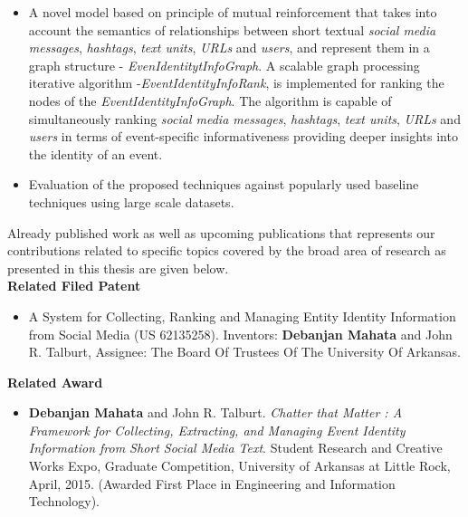 \begin{itemize}
\item A novel model based on principle of mutual reinforcement that takes into account the semantics of relationships between short textual \textit{social media messages}, \textit{hashtags}, \textit{text units}, \textit{URLs} and \textit{users}, and represent them in a graph structure - \textit{EvenIdentitytInfoGraph}. A scalable graph processing iterative algorithm -\textit{EventIdentityInfoRank}, is implemented for ranking the nodes of the \textit{EventIdentityInfoGraph}. The algorithm is capable of simultaneously ranking \textit{social media messages}, \textit{hashtags}, \textit{text units}, \textit{URLs} and \textit{users} in terms of event-specific informativeness providing deeper insights into the identity of an event.

\item Evaluation of the proposed techniques against popularly used baseline techniques using large scale datasets.

\end{itemize}

Already published work as well as upcoming publications that represents our contributions related to specific topics covered by the broad area of research as presented in this thesis are given below. \\ 

\textbf{\LARGE Related Filed Patent}
\begin{itemize}
\item A System for Collecting, Ranking and Managing Entity Identity Information from Social Media (US 62135258). Inventors: \textbf{Debanjan Mahata} and John R. Talburt, Assignee: The Board Of Trustees Of The University Of Arkansas.
\end{itemize}

\textbf{\LARGE Related Award}
\begin{itemize}
\item \textbf{Debanjan Mahata} and John R. Talburt. \textit{Chatter that Matter : A Framework for Collecting, Extracting, and Managing Event Identity Information from Short Social Media Text}. Student Research and Creative Works Expo, Graduate Competition, University of Arkansas at Little Rock, April, 2015. (Awarded First Place in Engineering and Information Technology).  
\end{itemize}

